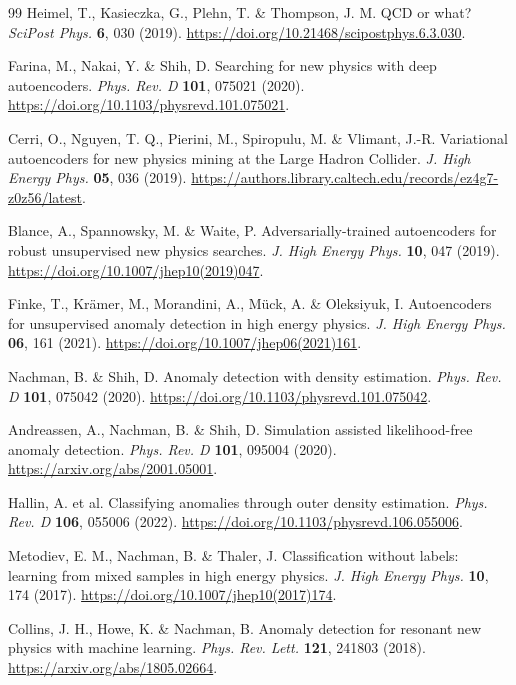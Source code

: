 \documentclass[11pt,a4paper]{article}
\begin{document}
\begin{thebibliography}{99}
 Heimel, T., Kasieczka, G., Plehn, T. \& Thompson, J. M. QCD or what? \textit{SciPost Phys.} \textbf{6}, 030 (2019). \url{https://doi.org/10.21468/scipostphys.6.3.030}.

 Farina, M., Nakai, Y. \& Shih, D. Searching for new physics with deep autoencoders. \textit{Phys. Rev. D} \textbf{101}, 075021 (2020). \url{https://doi.org/10.1103/physrevd.101.075021}.

 Cerri, O., Nguyen, T. Q., Pierini, M., Spiropulu, M. \& Vlimant, J.-R. Variational autoencoders for new physics mining at the Large Hadron Collider. \textit{J. High Energy Phys.} \textbf{05}, 036 (2019). \url{https://authors.library.caltech.edu/records/ez4g7-z0z56/latest}.

 Blance, A., Spannowsky, M. \& Waite, P. Adversarially-trained autoencoders for robust unsupervised new physics searches. \textit{J. High Energy Phys.} \textbf{10}, 047 (2019). \url{https://doi.org/10.1007/jhep10(2019)047}.

 Finke, T., Kr\"amer, M., Morandini, A., M\"uck, A. \& Oleksiyuk, I. Autoencoders for unsupervised anomaly detection in high energy physics. \textit{J. High Energy Phys.} \textbf{06}, 161 (2021). \url{https://doi.org/10.1007/jhep06(2021)161}.

 Nachman, B. \& Shih, D. Anomaly detection with density estimation. \textit{Phys. Rev. D} \textbf{101}, 075042 (2020). \url{https://doi.org/10.1103/physrevd.101.075042}.

 Andreassen, A., Nachman, B. \& Shih, D. Simulation assisted likelihood-free anomaly detection. \textit{Phys. Rev. D} \textbf{101}, 095004 (2020). \url{https://arxiv.org/abs/2001.05001}.

 Hallin, A. et al. Classifying anomalies through outer density estimation. \textit{Phys. Rev. D} \textbf{106}, 055006 (2022). \url{https://doi.org/10.1103/physrevd.106.055006}.

 Metodiev, E. M., Nachman, B. \& Thaler, J. Classification without labels: learning from mixed samples in high energy physics. \textit{J. High Energy Phys.} \textbf{10}, 174 (2017). \url{https://doi.org/10.1007/jhep10(2017)174}.

 Collins, J. H., Howe, K. \& Nachman, B. Anomaly detection for resonant new physics with machine learning. \textit{Phys. Rev. Lett.} \textbf{121}, 241803 (2018). \url{https://arxiv.org/abs/1805.02664}.


\end{thebibliography}
\end{document}

